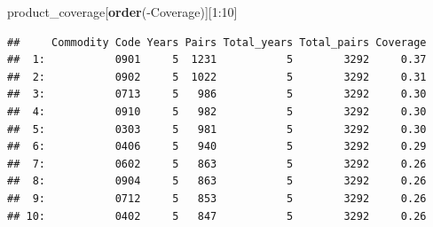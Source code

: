 \documentclass[10pt,]{article}
\newenvironment{Shaded}{\begin{snugshade}}{\end{snugshade}}
\newcommand{\KeywordTok}[1]{\textcolor[rgb]{0.13,0.29,0.53}{\textbf{{#1}}}}
\newcommand{\DecValTok}[1]{\textcolor[rgb]{0.00,0.00,0.81}{{#1}}}
\newcommand{\NormalTok}[1]{{#1}}
\begin{document}
\begin{Shaded}
\begin{Highlighting}[]
\NormalTok{product_coverage[}\KeywordTok{order}\NormalTok{(-Coverage)][}\DecValTok{1}\NormalTok{:}\DecValTok{10}\NormalTok{]}
\end{Highlighting}
\end{Shaded}

\begin{verbatim}
##     Commodity Code Years Pairs Total_years Total_pairs Coverage
##  1:           0901     5  1231           5        3292     0.37
##  2:           0902     5  1022           5        3292     0.31
##  3:           0713     5   986           5        3292     0.30
##  4:           0910     5   982           5        3292     0.30
##  5:           0303     5   981           5        3292     0.30
##  6:           0406     5   940           5        3292     0.29
##  7:           0602     5   863           5        3292     0.26
##  8:           0904     5   863           5        3292     0.26
##  9:           0712     5   853           5        3292     0.26
## 10:           0402     5   847           5        3292     0.26
\end{verbatim}
\end{document}
